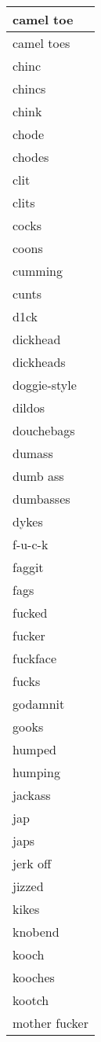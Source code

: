 \begin{longtable}{|l|}
camel toe \\ \hline 
camel toes \\ \hline 
chinc \\ \hline 
chincs \\ \hline 
chink \\ \hline 
chode \\ \hline 
chodes \\ \hline 
clit \\ \hline 
clits \\ \hline 
cocks \\ \hline 
coons \\ \hline 
cumming \\ \hline 
cunts \\ \hline 
d1ck \\ \hline 
dickhead \\ \hline 
dickheads \\ \hline 
doggie-style \\ \hline 
dildos \\ \hline 
douchebags \\ \hline 
dumass \\ \hline 
dumb ass \\ \hline 
dumbasses \\ \hline 
dykes \\ \hline 
f-u-c-k \\ \hline 
faggit \\ \hline 
fags \\ \hline 
fucked \\ \hline 
fucker \\ \hline 
fuckface \\ \hline 
fucks \\ \hline 
godamnit \\ \hline 
gooks \\ \hline 
humped \\ \hline 
humping \\ \hline 
jackass \\ \hline 
jap \\ \hline 
japs \\ \hline 
jerk off \\ \hline 
jizzed \\ \hline 
kikes \\ \hline 
knobend \\ \hline 
kooch \\ \hline 
kooches \\ \hline 
kootch \\ \hline 
mother fucker \\ \hline 

\end{longtable}
